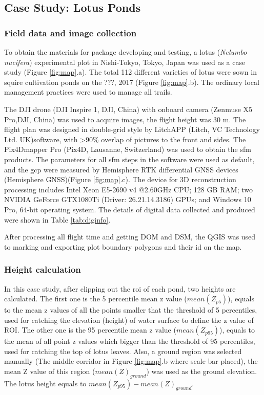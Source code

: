 \documentclass{configs/bmcart}
\begin{document}
\subsection*{Case Study: Lotus Ponds}

\subsubsection*{Field data and image collection}
To obtain the materials for package developing and testing, a lotus (\textit{Nelumbo nucifera}) experimental plot in Nishi-Tokyo, Tokyo, Japan was used as a case study (Figure \ref{fig:map}.a). The total 112 different varieties of lotus were sown in squire cultivation ponds on the ???, 2017 (Figure \ref{fig:map}.b). The ordinary local management practices were used to manage all trails.

The DJI drone (DJI Inspire 1, DJI, China) with onboard camera (Zenmuse X5 Pro,DJI, China) was used to acquire images, the flight height was 30 m. The flight plan was designed in double-grid style by LitchAPP (Litch, VC Technology Ltd. UK)software, with >90\% overlap of pictures to the front and sides. The Pix4Dmapper Pro  (Pix4D, Lausanne, Switzerland) was used to obtain the \acrshort*{sfm} products. The parameters for all \acrshort*{sfm} steps in the software were used as default, and the \acrfull*{gcp} were measured by Hemisphere RTK differential GNSS devices (Hemisphere GNSS)(Figure \ref{fig:map}.c). The device for 3D reconstruction processing includes Intel Xeon E5-2690 v4 @2.60GHz CPU; 128 GB RAM; two NVIDIA GeForce GTX1080Ti (Driver: 26.21.14.3186) GPUs; and Windows 10 Pro, 64-bit operating system. The details of digital data collected and produced were shown in Table \ref{tab:diginfo}.

After processing all flight time and getting DOM and DSM, the QGIS was used to marking and exporting plot boundary polygons and their id on the map.

\subsubsection*{Height calculation}
In this case study, after clipping out the \acrfull*{roi} of each pond, two heights are calculated. The first one is the 5 percentile mean z value ($mean(Z_{p5})$), equals to the mean z values of all the points smaller that the threshold of 5 percentiles, used for catching the elevation (height) of water surface to define the z value of ROI. The other one is the 95 percentile mean z value ($mean(Z_{p95})$), equals to the mean of all point z values which bigger than the threshold of 95 percentiles, used for catching the top of lotus leaves. Also, a ground region was selected manually (The middle corridor in Figure \ref{fig:map}.b where scale bar placed), the mean Z value of this region ($mean(Z)_{ground}$) was used as the ground elevation. The lotus height equals to $mean(Z_{p95}) - mean(Z)_{ground}$.
\end{document}
